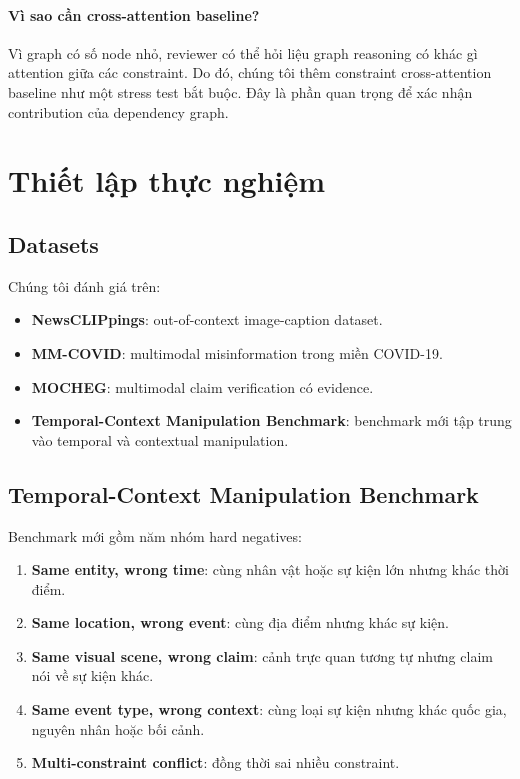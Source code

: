 \documentclass[11pt,a4paper]{article}
\begin{document}
\paragraph{Vì sao cần cross-attention baseline?}
Vì graph có số node nhỏ, reviewer có thể hỏi liệu graph reasoning có khác gì attention giữa các constraint. Do đó, chúng tôi thêm constraint cross-attention baseline như một stress test bắt buộc. Đây là phần quan trọng để xác nhận contribution của dependency graph.

\section{Thiết lập thực nghiệm}

\subsection{Datasets}

Chúng tôi đánh giá trên:

\begin{itemize}[leftmargin=1.5em]
\item \textbf{NewsCLIPpings}: out-of-context image-caption dataset.
\item \textbf{MM-COVID}: multimodal misinformation trong miền COVID-19.
\item \textbf{MOCHEG}: multimodal claim verification có evidence.
\item \textbf{Temporal-Context Manipulation Benchmark}: benchmark mới tập trung vào temporal và contextual manipulation.
\end{itemize}

\subsection{Temporal-Context Manipulation Benchmark}

Benchmark mới gồm năm nhóm hard negatives:

\begin{enumerate}[leftmargin=1.5em]
\item \textbf{Same entity, wrong time}: cùng nhân vật hoặc sự kiện lớn nhưng khác thời điểm.
\item \textbf{Same location, wrong event}: cùng địa điểm nhưng khác sự kiện.
\item \textbf{Same visual scene, wrong claim}: cảnh trực quan tương tự nhưng claim nói về sự kiện khác.
\item \textbf{Same event type, wrong context}: cùng loại sự kiện nhưng khác quốc gia, nguyên nhân hoặc bối cảnh.
\item \textbf{Multi-constraint conflict}: đồng thời sai nhiều constraint.
\end{enumerate}
\end{document}
